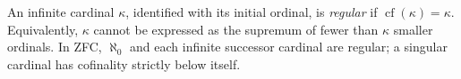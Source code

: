 
An infinite cardinal $\kappa$, identified with its initial ordinal, is \emph{regular} if $\operatorname{cf}(\kappa)=\kappa$. Equivalently, $\kappa$ cannot be expressed as the supremum of fewer than $\kappa$ smaller ordinals. In ZFC, $\aleph_0$ and each infinite successor cardinal are regular; a singular cardinal has cofinality strictly below itself.
